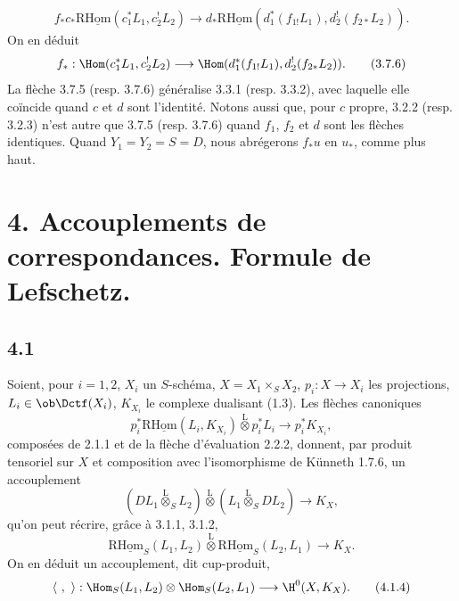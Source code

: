 \begin{equation}
f_*c_*\mathrm{R}\underline{\mathrm{Hom}}(c_1^*L_1,c_2^!L_2)
\longrightarrow
 d_*\mathrm{R}\underline{\mathrm{Hom}}(d_1^*(f_{1!}L_1),d_2^!(f_{2*}L_2)).
\tag{3.7.5}
\end{equation}
On en déduit
\begin{equation}
f_*:\Hom(c_1^*L_1,c_2^!L_2)
\longrightarrow
\Hom(d_1^*(f_{1!}L_1),d_2^!(f_{2*}L_2)).
\tag{3.7.6}
\end{equation}
La flèche 3.7.5 (resp. 3.7.6) généralise 3.3.1 (resp. 3.3.2), avec laquelle elle coïncide quand $c$ et $d$ sont l'identité. Notons aussi que, pour $c$ propre, 3.2.2 (resp. 3.2.3) n'est autre que 3.7.5 (resp. 3.7.6) quand $f_1$, $f_2$ et $d$ sont les flèches identiques. Quand $Y_1=Y_2=S=D$, nous abrégerons $f_*u$ en $u_*$, comme plus haut.

\section*{4. Accouplements de correspondances. Formule de Lefschetz.}

\subsection*{4.1}
Soient, pour $i=1,2$, $X_i$ un $S$-schéma, $X=X_1\times_SX_2$, $p_i:X\to X_i$ les projections, $L_i\in\ob\Dctf(X_i)$, $K_{X_i}$ le complexe dualisant (1.3). Les flèches canoniques
\begin{equation}
p_i^*\mathrm{R}\underline{\mathrm{Hom}}(L_i,K_{X_i})\overset{\mathrm{L}}{\otimes}p_i^*L_i
\longrightarrow p_i^*K_{X_i},
\tag{4.1.1}
\end{equation}
composées de 2.1.1 et de la flèche d'évaluation 2.2.2, donnent, par produit tensoriel sur $X$ et composition avec l'isomorphisme de Künneth 1.7.6, un accouplement
\begin{equation}
(DL_1\overset{\mathrm{L}}{\otimes}_S L_2)\overset{\mathrm{L}}{\otimes}(L_1\overset{\mathrm{L}}{\otimes}_S DL_2)
\longrightarrow K_X,
\tag{4.1.2}
\end{equation}
qu'on peut récrire, grâce à 3.1.1, 3.1.2,
\begin{equation}
\mathrm{R}\underline{\mathrm{Hom}}_S(L_1,L_2)\overset{\mathrm{L}}{\otimes}\mathrm{R}\underline{\mathrm{Hom}}_S(L_2,L_1)
\longrightarrow K_X.
\tag{4.1.3}
\end{equation}
On en déduit un accouplement, dit cup-produit,
\begin{equation}
\langle\ ,\ \rangle:\Hom_S(L_1,L_2)\otimes\Hom_S(L_2,L_1)
\longrightarrow \H^0(X,K_X).
\tag{4.1.4}
\end{equation}

